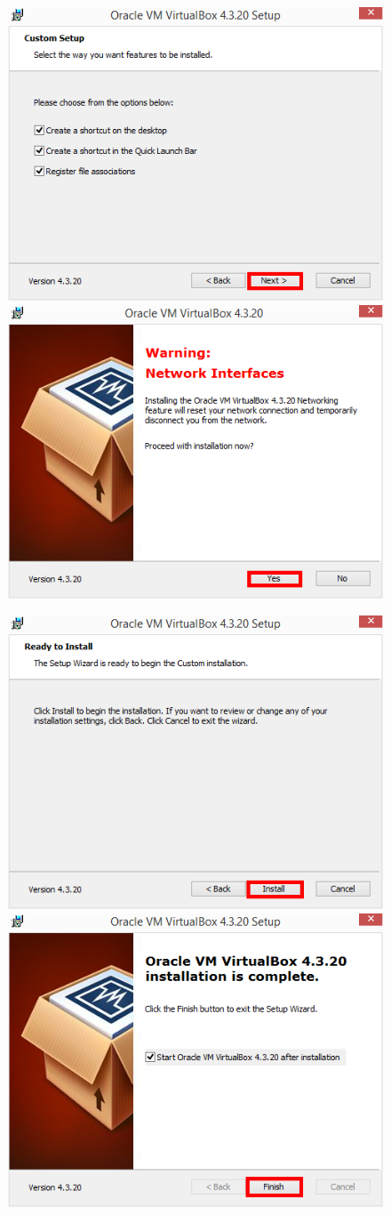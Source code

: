 \begin{figure}[h]
\centering
\includegraphics[width=0.42\columnwidth]{pictures/chapter3/vm3.png}
\includegraphics[width=0.42\columnwidth]{pictures/chapter3/vm4.png}
\end{figure}

\newpage

\begin{figure}[h]
\centering
\includegraphics[width=0.49\columnwidth]{pictures/chapter3/vm5.png}
\includegraphics[width=0.49\columnwidth]{pictures/chapter3/vm6.png}
\end{figure}

